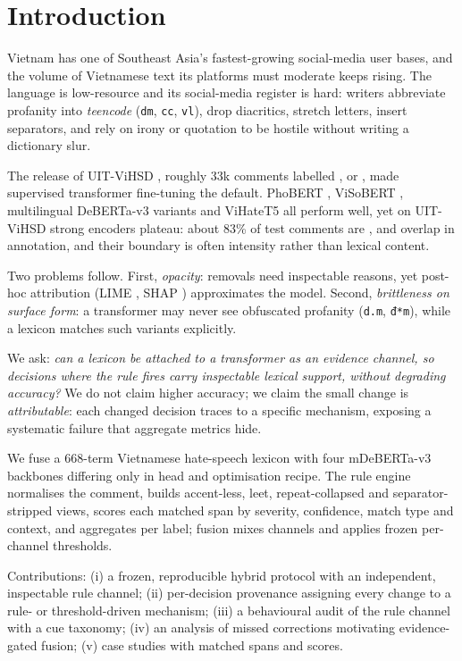 \section{Introduction}
\label{sec:intro}

Vietnam has one of Southeast Asia's fastest-growing social-media user bases, and the
volume of Vietnamese text its platforms must moderate keeps rising. The language is low-resource
and its social-media register is hard: writers abbreviate profanity into
\emph{teencode} (\texttt{dm}, \texttt{cc}, \texttt{vl}), drop diacritics, stretch
letters, insert separators, and rely on irony or quotation to be hostile without
writing a dictionary slur.

The release of UIT-ViHSD \cite{luu2021vihsd}, roughly 33k comments labelled
\clean{}, \off{} or \hate{}, made supervised transformer fine-tuning the default.
PhoBERT \cite{nguyen2020phobert}, ViSoBERT \cite{nguyen2023visobert}, multilingual
DeBERTa-v3 variants \cite{he2021deberta,he2023debertav3,liu2024mdeberta} and
ViHateT5 \cite{nguyen2024vihatet5} all perform well, yet on UIT-ViHSD strong encoders
plateau: about 83\% of test comments are \clean{}, \hate{} and \off{} overlap in
annotation, and their boundary is often intensity rather than lexical content.

Two problems follow. First, \emph{opacity}: removals need inspectable reasons, yet
post-hoc attribution (LIME \cite{ribeiro2016why}, SHAP \cite{lundberg2017shap})
approximates the model. Second, \emph{brittleness on surface form}: a transformer may
never see obfuscated profanity (\texttt{d.m}, \texttt{đ*m}), while a lexicon matches
such variants explicitly.

We ask: \emph{can a lexicon be attached to a transformer as an evidence channel, so
decisions where the rule fires carry inspectable lexical support, without degrading accuracy?} We
do not claim higher accuracy; we claim the small change is \emph{attributable}: each
changed decision traces to a specific mechanism, exposing a systematic failure that
aggregate metrics hide.

We fuse a 668-term Vietnamese hate-speech lexicon with four mDeBERTa-v3 backbones
differing only in head and optimisation recipe. The rule engine normalises the comment, builds
accent-less, leet, repeat-collapsed and separator-stripped views, scores each matched
span by severity, confidence, match type and context, and aggregates per label; fusion
mixes channels and applies frozen per-channel thresholds.

Contributions: (i) a frozen, reproducible hybrid protocol with an independent,
inspectable rule channel; (ii) per-decision provenance assigning every change to a
rule- or threshold-driven mechanism; (iii) a behavioural audit of the rule channel
with a cue taxonomy; (iv) an analysis of missed corrections motivating
evidence-gated fusion; (v) case studies with matched spans and scores.